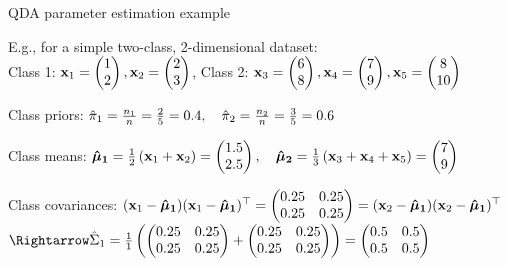 \documentclass[11pt,compress,t,notes=noshow, xcolor=table]{beamer}
\begin{document}
\begin{vbframe}{QDA parameter estimation example}
\begin{small}
E.g., for a simple two-class, 2-dimensional dataset:\\

Class 1: $\xv_1 = \begin{pmatrix} 1 \\ 2 \end{pmatrix}, \xv_2 = \begin{pmatrix} 2 \\ 3 \end{pmatrix} $, 
Class 2: $\xv_3 = \begin{pmatrix} 6 \\ 8 \end{pmatrix}, \xv_4 = \begin{pmatrix} 7 \\ 9 \end{pmatrix}, \xv_5 = \begin{pmatrix} 8 \\ 10 \end{pmatrix}$

\lz

Class priors: $\pikh[1] = \frac{n_1}{n} = \frac{2}{5} = 0.4, \quad \pikh[2] = \frac{n_2}{n} = \frac{3}{5} = 0.6$

Class means: $\mukh[1] = \frac{1}{2} \left( \xv_1 + \xv_2 \right) = \begin{pmatrix} 1.5 \\ 2.5 \end{pmatrix}, \quad \mukh[2] = \frac{1}{3} \left( \xv_3 + \xv_4 + \xv_5 \right) = \begin{pmatrix} 7 \\ 9 \end{pmatrix}$

Class covariances: $(\xv_1 - \mukh[1])(\xv_1 - \mukh[1])^\top = \begin{pmatrix} 0.25 & 0.25 \\ 0.25 & 0.25 \end{pmatrix} = (\xv_2 - \mukh[1])(\xv_2 - \mukh[1])^\top$\\ 
$\Rightarrow \Sigmah_1 = \frac{1}{1} \left(\begin{pmatrix} 0.25 & 0.25 \\ 0.25 & 0.25 \end{pmatrix} + \begin{pmatrix} 0.25 & 0.25 \\ 0.25 & 0.25 \end{pmatrix} \right) = \begin{pmatrix} 0.5 & 0.5 \\ 0.5 & 0.5 \end{pmatrix}$


\end{small}
\end{vbframe}
\end{document}
